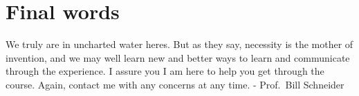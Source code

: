 \documentclass[11pt]{article}
\begin{document}
\section{Final words}
\label{sec:orgf01fd15}
We truly are in uncharted water heres.  But as they say, necessity is the mother of invention, and we may well learn new and better ways to learn and communicate through the experience. I assure you I am here to help you get through the course. Again, contact me with any concerns at any time. - Prof.~Bill Schneider
\end{document}
